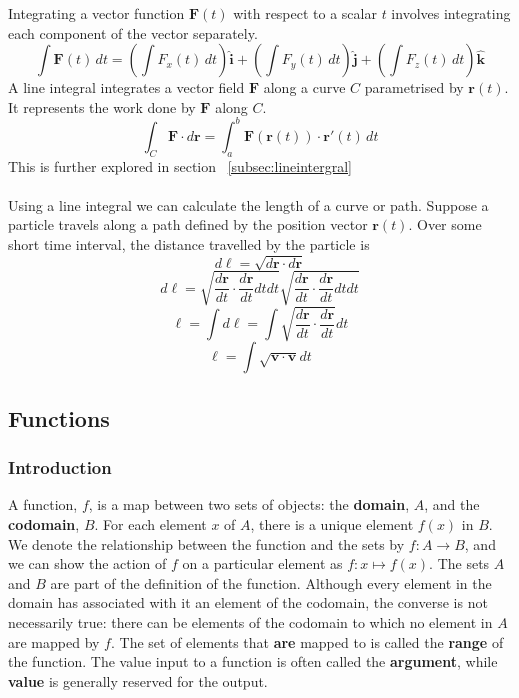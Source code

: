 \documentclass[11pt,titlepage]{article}
\numberwithin{equation}{section}
\begin{document}
Integrating a vector function $\mathbf{F}(t)$ with respect to a scalar $t$ involves integrating each component of the vector separately.
    \begin{equation}
        \int \mathbf{F}(t) \, dt = \left( \int F_x(t) \, dt \right) \mathbf{\hat{i}} + \left( \int F_y(t) \, dt \right) \mathbf{\hat{j}} + \left( \int F_z(t) \, dt \right) \mathbf{\hat{k}}
    \end{equation}
A line integral integrates a vector field $\mathbf{F}$ along a curve $C$ parametrised by $\mathbf{r}(t)$. It represents the work done by $\mathbf{F}$ along $C$.
    \begin{equation}
        \int_C \mathbf{F} \cdot d\mathbf{r} = \int_a^b \mathbf{F}(\mathbf{r}(t)) \cdot \mathbf{r}'(t) \, dt
    \end{equation}
This is further explored in section \ \ref{subsec:lineintergral}
\\\\
Using a line integral we can calculate the length of a curve or path. Suppose a particle travels along a path defined by the position vector $\mathbf{r}(t)$. Over some short time interval, the distance travelled by the particle is
\begin{equation}
    d\ell=\sqrt{d\mathbf{r}\cdot d\mathbf{r}}
\end{equation}
\begin{equation}
    d\ell=\sqrt{\frac{d\mathbf{r}}{dt}\cdot \frac{d\mathbf{r}}{dt}dtdt}\sqrt{\frac{d\mathbf{r}}{dt}\cdot \frac{d\mathbf{r}}{dt}dtdt}
\end{equation}
\begin{equation}
    \ell=\int d\ell=\int \sqrt{\frac{d\mathbf{r}}{dt}\cdot \frac{d\mathbf{r}}{dt}}dt
\end{equation}
\begin{equation}
    \ell=\int \sqrt{\textbf{v}\cdot \mathbf{v}}dt
\end{equation}
\subsection{Functions}
\subsubsection{Introduction}
A function, $f$, is a map between two sets of objects: the \textbf{domain}, $A$, and the \textbf{codomain}, $B$. For each element $x$ of $A$, there is a unique element $f(x)$ in $B$. We denote the relationship between the function and the sets by $f:A\to B$, and we can show the action of $f$ on a particular element as $f:x\mapsto f(x)$. The sets $A$ and $B$ are part of the definition of the function. Although every element in the domain has associated with it an element of the codomain, the converse is not necessarily true: there can be elements of the codomain to which no element in $A$ are mapped by $f$. The set of elements that \textbf{are} mapped to is called the \textbf{range} of the function. The value input to a function is often called the \textbf{argument}, while \textbf{value} is generally reserved for the output.
\end{document}
